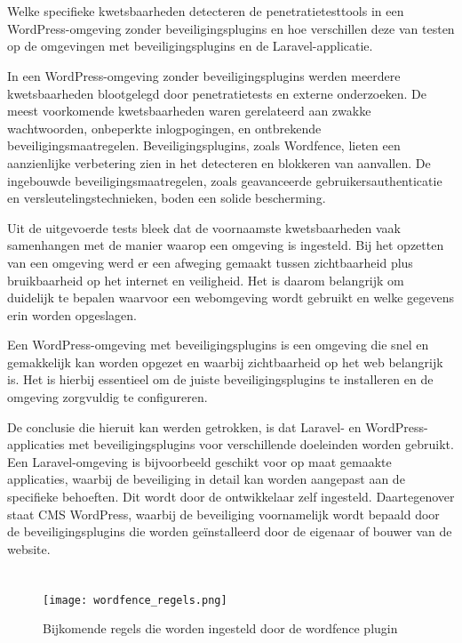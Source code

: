   \section{}  
   Welke specifieke kwetsbaarheden detecteren de penetratietesttools in een WordPress-omgeving zonder beveiligingsplugins en 
   hoe verschillen deze van testen op de omgevingen met beveiligingsplugins en de Laravel-applicatie.
  
  In een WordPress-omgeving zonder beveiligingsplugins werden meerdere kwetsbaarheden blootgelegd door penetratietests en 
  externe onderzoeken. De meest voorkomende kwetsbaarheden waren gerelateerd aan zwakke wachtwoorden, onbeperkte 
  inlogpogingen, en ontbrekende beveiligingsmaatregelen. Beveiligingsplugins, zoals Wordfence, lieten een aanzienlijke 
  verbetering zien in het detecteren en blokkeren van aanvallen. De ingebouwde beveiligingsmaatregelen, zoals geavanceerde 
  gebruikersauthenticatie en versleutelingstechnieken, boden een solide bescherming.

  Uit de uitgevoerde tests bleek dat de voornaamste kwetsbaarheden vaak samenhangen met de manier waarop een omgeving is 
  ingesteld. Bij het opzetten van een omgeving werd er een afweging gemaakt tussen zichtbaarheid plus bruikbaarheid op het 
  internet en veiligheid. Het is daarom belangrijk om duidelijk te bepalen waarvoor een webomgeving wordt gebruikt en welke 
  gegevens erin worden opgeslagen.

  Een WordPress-omgeving met beveiligingsplugins is een omgeving die snel en gemakkelijk kan worden opgezet en waarbij 
  zichtbaarheid op het web belangrijk is. Het is hierbij essentieel om de juiste beveiligingsplugins te installeren en de 
  omgeving zorgvuldig te configureren.

  De conclusie die hieruit kan werden getrokken, is dat Laravel- en WordPress-applicaties met beveiligingsplugins voor 
  verschillende doeleinden worden gebruikt. Een Laravel-omgeving is bijvoorbeeld geschikt voor op maat gemaakte applicaties, 
  waarbij de beveiliging in detail kan worden aangepast aan de specifieke behoeften. Dit wordt door de ontwikkelaar zelf 
  ingesteld. Daartegenover staat CMS WordPress, waarbij de beveiliging voornamelijk wordt bepaald door de beveiligingsplugins 
  die worden geïnstalleerd door de eigenaar of bouwer van de website.

  \section{}  
  \begin{figure}
    \centering
    \texttt{[image: wordfence\_regels.png]}
    \caption[Bijkomende regels die worden ingesteld door de wordfence plugin]{Bijkomende regels die worden ingesteld door de wordfence plugin}
    \label{fig:wordfence_regels}
  \end{figure}


